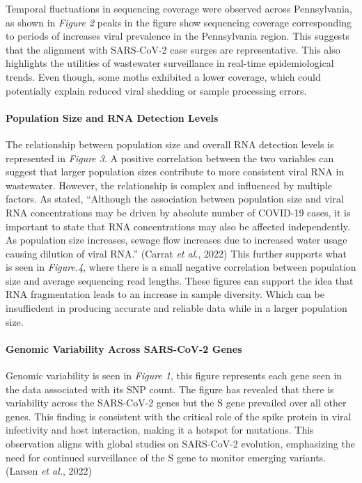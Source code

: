 \documentclass[
]{article}
\begin{document}
Temporal fluctuations in sequencing coverage were observed across
Pennsylvania, as shown in \emph{Figure 2} peaks in the figure show
sequencing coverage corresponding to periods of increases viral
prevalence in the Pennsylvania region. This suggests that the alignment
with SARS-CoV-2 case surges are representative. This also highlights the
utilities of wastewater surveillance in real-time epidemiological
trends. Even though, some moths exhibited a lower coverage, which could
potentially explain reduced viral shedding or sample processing errors.

\hypertarget{population-size-and-rna-detection-levels}{%
\paragraph{Population Size and RNA Detection
Levels}\label{population-size-and-rna-detection-levels}}

The relationship between population size and overall RNA detection
levels is represented in \emph{Figure 3}. A positive correlation between
the two variables can suggest that larger population sizes contribute to
more consistent viral RNA in wastewater. However, the relationship is
complex and influenced by multiple factors. As stated, ``Although the
association between population size and viral RNA concentrations may be
driven by absolute number of COVID-19 cases, it is important to state
that RNA concentrations may also be affected independently. As
population size increases, sewage flow increases due to increased water
usage causing dilution of viral RNA.'' (Carrat \emph{et al.}, 2022) This
further supports what is seen in \emph{Figure.4}, where there is a small
negative correlation between population size and average sequencing read
lengths. These figures can support the idea that RNA fragmentation leads
to an increase in sample diversity. Which can be insufficdent in
producing accurate and reliable data while in a larger population size.

\hypertarget{genomic-variability-across-sars-cov-2-genes}{%
\paragraph{Genomic Variability Across SARS-CoV-2
Genes}\label{genomic-variability-across-sars-cov-2-genes}}

Genomic variability is seen in \emph{Figure 1}, this figure represents
each gene seen in the data associated with its SNP count. The figure has
revealed that there is variability across the SARS-CoV-2 genes but the S
gene prevailed over all other genes. This finding is consistent with the
critical role of the spike protein in viral infectivity and host
interaction, making it a hotspot for mutations. This observation aligns
with global studies on SARS-CoV-2 evolution, emphasizing the need for
continued surveillance of the S gene to monitor emerging
variants.(Larsen \emph{et al.}, 2022)
\end{document}
